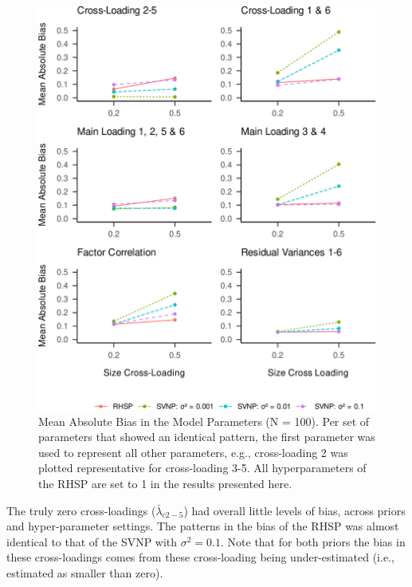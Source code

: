 \documentclass[
  man, donotrepeattitle,floatsintext]{apa6}
\begin{document}
\begin{figure}
\centering
\includegraphics{JMBKoch_thesis_files/figure-latex/unnamed-chunk-5-1.pdf}
\caption{\label{fig:unnamed-chunk-5}Mean Absolute Bias in the Model Parameters (N = 100). Per set of parameters that showed an identical pattern, the first parameter was used to represent all other parameters, e.g., cross-loading 2 was plotted representative for cross-loading 3-5. All hyperparameters of the RHSP are set to 1 in the results presented here.}
\end{figure}

The truly zero cross-loadings (\(\bar{\lambda}_{c 2-5}\)) had overall little levels of bias, across priors and hyper-parameter settings. The patterns in the bias of the RHSP was almost identical to that of the SVNP with \(\sigma^2 = 0.1\). Note that for both priors the bias in these cross-loadings comes from these cross-loading being under-estimated (i.e., estimated as smaller than zero).
\end{document}
